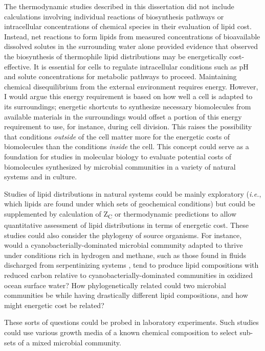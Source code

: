 The thermodynamic studies described in this dissertation did not include calculations involving individual reactions of biosynthesis pathways or intracellular concentrations of chemical species in their evaluation of lipid cost. Instead, net reactions to form lipids from measured concentrations of bioavailable dissolved solutes in the surrounding water alone provided evidence that observed the biosynthesis of thermophile lipid distributions may be energetically cost-effective. It is essential for cells to regulate intracellular conditions such as pH and solute concentrations for metabolic pathways to proceed. Maintaining chemical disequilibrium from the external environment requires energy. However, I would argue this energy requirement is based on how well a cell is adapted to its surroundings; energetic shortcuts to synthesize necessary biomolecules from available materials in the surroundings would offset a portion of this energy requirement to use, for instance, during cell division. This raises the possibility that conditions \textit{outside} of the cell matter more for the energetic costs of biomolecules than the conditions \textit{inside} the cell. This concept could serve as a foundation for studies in molecular biology to evaluate potential costs of biomolecules synthesized by microbial communities in a variety of natural systems and in culture.

Studies of lipid distributions in natural systems could be mainly exploratory (\textit{i.e.}, which lipids are found under which sets of geochemical conditions) but could be supplemented by calculation of Z\textsubscript{C} or thermodynamic predictions to allow quantitative assessment of lipid distributions in terms of energetic cost. These studies could also consider the phylogeny of source organisms. For instance, would a cyanobacterially-dominated microbial community adapted to thrive under conditions rich in hydrogen and methane, such as those found in fluids discharged from serpentinizing systems \citep{}, tend to produce lipid compositions with reduced carbon relative to cyanobacterially-dominated communities in oxidized ocean surface water? How phylogenetically related could two microbial communities be while having drastically different lipid compositions, and how might energetic cost be related?

These sorts of questions could be probed in laboratory experiments. Such studies could use various growth media of a known chemical composition to select sub-sets of a mixed microbial community.

